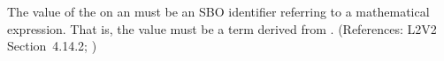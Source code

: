 The value of the   on an \EventAssignment must be an
SBO identifier referring to a mathematical expression.  That is, the value
must be a term derived from \sbomathformula.  (References: L2V2 Section~4.14.2;
)
